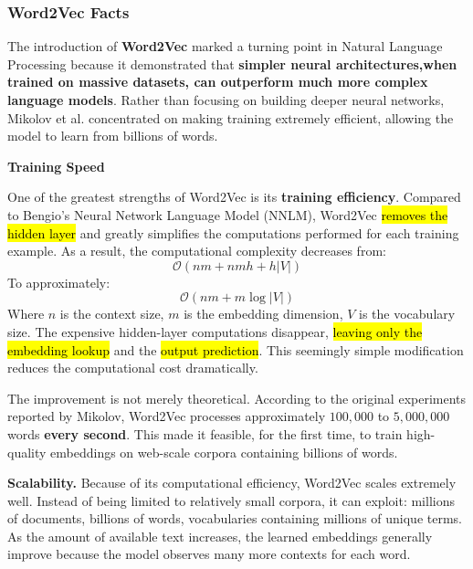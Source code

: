 \subsubsection{Word2Vec Facts}\label{sec:word2vec-facts}

The introduction of \textbf{Word2Vec} marked a turning point in Natural Language Processing because it demonstrated that \textbf{simpler neural architectures,\break when trained on massive datasets, can outperform much more complex language models}. Rather than focusing on building deeper neural networks, Mikolov et al. concentrated on making training extremely efficient, allowing the model to learn from billions of words.

\highspace
\begin{flushleft}
    \textcolor{Green3}{ \textbf{Training Speed}}
\end{flushleft}
One of the greatest strengths of Word2Vec is its \textbf{training efficiency}. Compared to Bengio's Neural Network Language Model (NNLM), Word2Vec \hl{removes the hidden layer} and greatly simplifies the computations performed for each training example. As a result, the computational complexity decreases from:
\begin{equation*}
    \mathcal{O}\left(nm + nmh + h\left|V\right|\right)
\end{equation*}
To approximately:
\begin{equation*}
    \mathcal{O}\left(nm + m\log\left|V\right|\right)
\end{equation*}
Where $n$ is the context size, $m$ is the embedding dimension, $V$ is the vocabulary size. The expensive hidden-layer computations disappear, \hl{leaving only the embedding lookup} and the \hl{output prediction}. This seemingly simple modification reduces the computational cost dramatically.

\highspace
The improvement is not merely theoretical. According to the original experiments reported by Mikolov, Word2Vec processes approximately $100,000$ to $5,000,000$ words \textbf{every second}. This made it feasible, for the first time, to train high-quality embeddings on web-scale corpora containing billions of words.

\highspace
\textcolor{Green3}{ \textbf{Scalability.}} Because of its computational efficiency, Word2Vec scales extremely well. Instead of being limited to relatively small corpora, it can exploit: millions of documents, billions of words, vocabularies containing millions of unique terms. As the amount of available text increases, the learned embeddings generally improve because the model observes many more contexts for each word.

